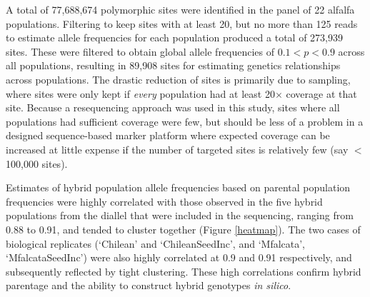 \documentclass[12pt, letterpaper]{article}
\begin{document}
A total of 77,688,674 polymorphic sites were identified in the panel of 22 alfalfa populations. Filtering to keep sites with at least 20, but no more than 125 reads to estimate allele frequencies for each population produced a total of 273,939 sites. These were filtered to obtain global allele frequencies of $0.1 < p < 0.9$ across all populations, resulting in 89,908 sites for estimating genetics relationships across populations. The drastic reduction of sites is primarily due to sampling, where sites were only kept if \emph{every} population had at least 20$\times$ coverage at that site. Because a resequencing approach was used in this study, sites where all populations had sufficient coverage were few, but should be less of a problem in a designed sequence-based marker platform where expected coverage can be increased at little expense if the number of targeted sites is relatively few (say $<$ 100,000 sites). 





Estimates of hybrid population allele frequencies based on parental population frequencies were highly correlated with those observed in the five hybrid populations from the diallel that were included in the sequencing, ranging from 0.88 to 0.91, and tended to cluster together (Figure \ref{heatmap}). The two cases of biological replicates (`Chilean' and `ChileanSeedInc', and `Mfalcata', `MfalcataSeedInc') were also highly correlated at 0.9 and 0.91 respectively, and subsequently reflected by tight clustering. These high correlations confirm hybrid parentage and the ability to construct hybrid genotypes \emph{in silico}. 
\end{document}
